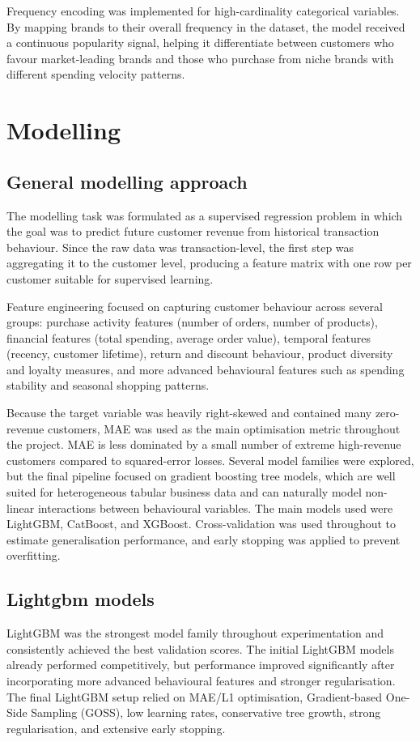 Frequency encoding was implemented for high-cardinality categorical variables. By mapping brands to their overall frequency in the dataset, the model received a continuous popularity signal, helping it differentiate between customers who favour market-leading brands and those who purchase from niche brands with different spending velocity patterns.

\section{Modelling}
\subsection{General modelling approach}
The modelling task was formulated as a supervised regression problem in which the goal was to predict future customer revenue from historical transaction behaviour. Since the raw data was transaction-level, the first step was aggregating it to the customer level, producing a feature matrix with one row per customer suitable for supervised learning.

Feature engineering focused on capturing customer behaviour across several groups: purchase activity features (number of orders, number of products), financial features (total spending, average order value), temporal features (recency, customer lifetime), return and discount behaviour, product diversity and loyalty measures, and more advanced behavioural features such as spending stability and seasonal shopping patterns.

Because the target variable was heavily right-skewed and contained many zero-revenue customers, MAE was used as the main optimisation metric throughout the project. MAE is less dominated by a small number of extreme high-revenue customers compared to squared-error losses. Several model families were explored, but the final pipeline focused on gradient boosting tree models, which are well suited for heterogeneous tabular business data and can naturally model non-linear interactions between behavioural variables. The main models used were LightGBM, CatBoost, and XGBoost. Cross-validation was used throughout to estimate generalisation performance, and early stopping was applied to prevent overfitting.

\subsection{Lightgbm models}
LightGBM was the strongest model family throughout experimentation and consistently achieved the best validation scores. The initial LightGBM models already performed competitively, but performance improved significantly after incorporating more advanced behavioural features and stronger regularisation. The final LightGBM setup relied on MAE/L1 optimisation, Gradient-based One-Side Sampling (GOSS), low learning rates, conservative tree growth, strong regularisation, and extensive early stopping.

